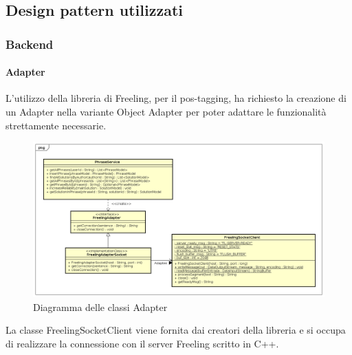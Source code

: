 \subsection{Design pattern utilizzati}
\subsubsection{Backend}
\paragraph{Adapter}
L'utilizzo della libreria di Freeling, per il pos-tagging, ha richiesto la creazione di un Adapter nella variante Object Adapter per poter adattare le funzionalità strettamente necessarie.
\begin{figure}[H]
\includegraphics[width=17cm]{img/Adapter.png} 
\caption{Diagramma delle classi Adapter}
\end{figure}
La classe FreelingSocketClient viene fornita dai creatori della libreria e si occupa di realizzare la connessione con il server Freeling scritto in C++.
